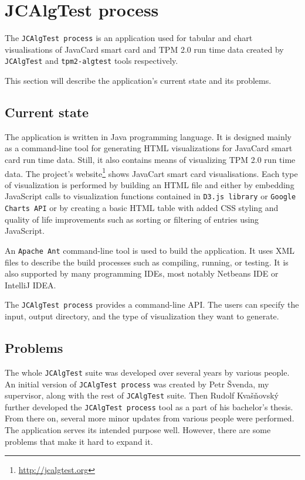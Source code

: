 \section{JCAlgTest process}
The \texttt{JCAlgTest process} is an application used for tabular and chart visualisations of JavaCard smart card and TPM 2.0 run time data created by \texttt{JCAlgTest} and \texttt{tpm2-algtest} tools respectively. 

This section will describe the application's current state and its problems.
\subsection{Current state}
The application is written in Java programming language. It is designed mainly as a command-line tool for generating HTML visualizations for JavaCard smart card run time data. Still, it also contains means of visualizing TPM 2.0 run time data. The project's website\footnote{\url{http://jcalgtest.org}} shows JavaCart smart card visualisations. Each type of visualization is performed by building an HTML file and either by embedding JavaScript calls to visualization functions contained in  \texttt{D3.js library} or \texttt{Google Charts API} or by creating a basic HTML table with added CSS styling and quality of life improvements such as sorting or filtering of entries using JavaScript. 

An \texttt{Apache Ant} command-line tool is used to build the application. It uses XML files to describe the build processes such as compiling, running, or testing. It is also supported by many programming IDEs, most notably Netbeans IDE or IntelliJ IDEA.

The \texttt{JCAlgTest process} provides a command-line API. The users can specify the input, output directory, and the type of visualization they want to generate.

\subsection{Problems}\label{subsec:design-problems}
The whole \texttt{JCAlgTest} suite was developed over several years by various people. An initial version of \texttt{JCAlgTest process} was created by Petr Švenda, my supervisor, along with the rest of \texttt{JCAlgTest} suite. Then Rudolf Kvašňovský further developed the \texttt{JCAlgTest process} tool as a part of his bachelor's thesis. From there on, several more minor updates from various people were performed. The application serves its intended purpose well. However, there are some problems that make it hard to expand it.

